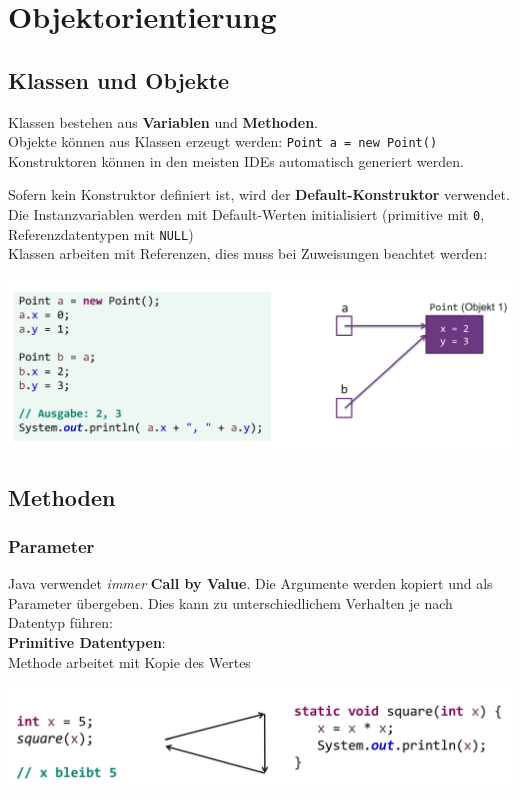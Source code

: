 {\small
\section{Objektorientierung}

\subsection{Klassen und Objekte}{\label{Klassen}}
    Klassen bestehen aus \textbf{Variablen} und \textbf{Methoden}.\\
    Objekte können aus Klassen erzeugt werden: \verb|Point a = new Point()|\\
    Konstruktoren können in den meisten IDEs automatisch generiert werden.

    Sofern kein Konstruktor definiert ist, wird der \textbf{Default-Konstruktor} verwendet. Die Instanzvariablen werden mit
    Default-Werten initialisiert (primitive mit \verb|0|, Referenzdatentypen mit \verb|NULL|)\\

    Klassen arbeiten mit Referenzen, dies muss bei Zuweisungen beachtet werden:
    \begin{center}
        \includegraphics[width=0.9\columnwidth]{pictures/copy-semantics.png}    
    \end{center}
    \vspace{-0.3cm}

\subsection{Methoden}

    \subsubsection{Parameter}
        Java verwendet \textit{immer} \textbf{Call by Value}. Die Argumente werden kopiert und als Parameter übergeben. Dies kann zu unterschiedlichem Verhalten
        je nach Datentyp führen:\\

        \textbf{Primitive Datentypen}:\\
        Methode arbeitet mit Kopie des Wertes
        \begin{center}
            \includegraphics[width=0.9\columnwidth]{pictures/primitive-params.png}    
        \end{center}

}
